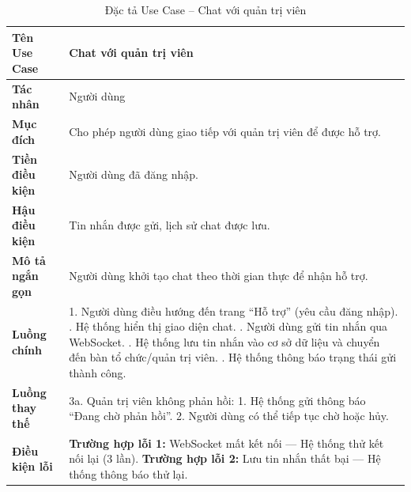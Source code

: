 \begin{table}[H]
\centering
\renewcommand{\arraystretch}{1.3}
\setlength{\tabcolsep}{8pt}
\begin{tabularx}{\textwidth}{|l|X|}
\hline
\textbf{Tên Use Case} & Chat với quản trị viên \\ \hline
\textbf{Tác nhân} & Người dùng \\ \hline
\textbf{Mục đích} & Cho phép người dùng giao tiếp với quản trị viên để được hỗ trợ. \\ \hline
\textbf{Tiền điều kiện} & Người dùng đã đăng nhập. \\ \hline
\textbf{Hậu điều kiện} & Tin nhắn được gửi, lịch sử chat được lưu. \\ \hline
\textbf{Mô tả ngắn gọn} & Người dùng khởi tạo chat theo thời gian thực để nhận hỗ trợ. \\ \hline
\textbf{Luồng chính} &
1. Người dùng điều hướng đến trang “Hỗ trợ” (yêu cầu đăng nhập). \newline
2. Hệ thống hiển thị giao diện chat. \newline
3. Người dùng gửi tin nhắn qua WebSocket. \newline
4. Hệ thống lưu tin nhắn vào cơ sở dữ liệu và chuyển đến bàn tổ chức/quản trị viên. \newline
5. Hệ thống thông báo trạng thái gửi thành công. \\ \hline
\textbf{Luồng thay thế} &
3a. Quản trị viên không phản hồi: \newline
\hspace*{1em}1. Hệ thống gửi thông báo “Đang chờ phản hồi”. \newline
\hspace*{1em}2. Người dùng có thể tiếp tục chờ hoặc hủy. \\ \hline
\textbf{Điều kiện lỗi} &
\textbf{Trường hợp lỗi 1:} WebSocket mất kết nối — Hệ thống thử kết nối lại (3 lần). \newline
\textbf{Trường hợp lỗi 2:} Lưu tin nhắn thất bại — Hệ thống thông báo thử lại. \\ \hline
\end{tabularx}
\vspace{15pt}
\caption{Đặc tả Use Case -- Chat với quản trị viên}
\label{tab:uc_chat_admin}
\end{table}

